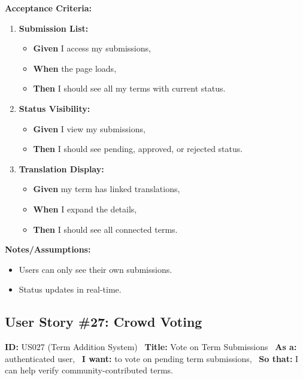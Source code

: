 \documentclass[12pt]{article}
\begin{document}
\vspace{1em}
\textbf{Acceptance Criteria:}
\begin{enumerate}
\item \textbf{Submission List:}
\begin{itemize}
\item \textbf{Given} I access my submissions,
\item \textbf{When} the page loads,
\item \textbf{Then} I should see all my terms with current status.
\end{itemize}

\item \textbf{Status Visibility:}
\begin{itemize}
    \item \textbf{Given} I view my submissions,
    \item \textbf{Then} I should see pending, approved, or rejected status.
\end{itemize}

\item \textbf{Translation Display:}
\begin{itemize}
    \item \textbf{Given} my term has linked translations,
    \item \textbf{When} I expand the details,
    \item \textbf{Then} I should see all connected terms.
\end{itemize}
\end{enumerate}

\vspace{1em}
\textbf{Notes/Assumptions:}
\begin{itemize}
\item Users can only see their own submissions.
\item Status updates in real-time.
\end{itemize}

\subsection{User Story \#27: Crowd Voting}
\textbf{ID:} US027 (Term Addition System) \
\textbf{Title:} Vote on Term Submissions \
\textbf{As a:} authenticated user, \
\textbf{I want:} to vote on pending term submissions, \
\textbf{So that:} I can help verify community-contributed terms.
\end{document}
